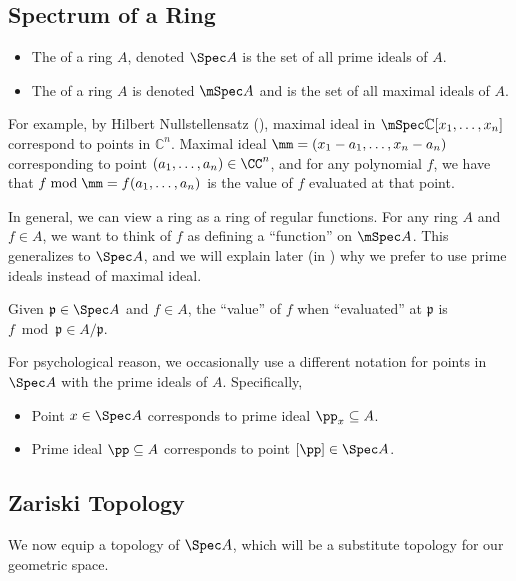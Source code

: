 \subsection{Spectrum of a Ring}
\begin{definition}[Spectrum]
    \begin{itemize}
    \item The  of a ring $A$,
    denoted $\Spec A$ is the set of
    all prime ideals of $A$.
    \item The  of a ring $A$
    is denoted $\mSpec A$
    and is the set of all maximal ideals of $A$.
    \end{itemize}
\end{definition}
For example, by Hilbert Nullstellensatz
(),
maximal ideal in $\mSpec\mathbb C[x_1,\dots,x_n]$
correspond to points in $\mathbb C^n$.
Maximal ideal $\mm = (x_1-a_1,\dots,x_n-a_n)$
corresponding to point $(a_1,\dots,a_n)\in\CC^n$,
and for any polynomial $f$, we have that 
$f\bmod \mm = f(a_1,\dots,a_n)$ is the value of 
$f$ evaluated at that point.

In general, we can view a ring as a ring of regular functions.
For any ring $A$ and $f\in A$,
we want to think of $f$ as defining a ``function''
on $\mSpec A$.
This generalizes to $\Spec A$, and we will explain 
later (in ) 
why we prefer to use prime ideals instead of maximal ideal.
\begin{definition}
    Given $\mathfrak p\in \Spec A$ and $f\in A$,
    the ``value'' of $f$ when ``evaluated'' at $\mathfrak p$
    is $f\bmod\mathfrak p \in A/\mathfrak p$.
\end{definition}
For psychological reason, we occasionally use a different notation for
points in $\Spec A$ with the prime ideals of $A$. Specifically,
\begin{itemize}
    \item Point $x\in \Spec A$ corresponds to prime ideal 
    $\pp_x\subseteq A$.
    \item Prime ideal $\pp\subseteq A$ corresponds to point $[\pp]\in\Spec A$.
\end{itemize}

\subsection{Zariski Topology}
We now equip a topology of $\Spec A$,
which will be a substitute topology for our geometric space.

